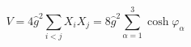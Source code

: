\begin{equation}
V=4\hat g^2 \sum_{i<j}{X_iX_j}=8\hat g^2\sum_{\alpha=1}^3\cosh\varphi_\alpha
\end{equation}


